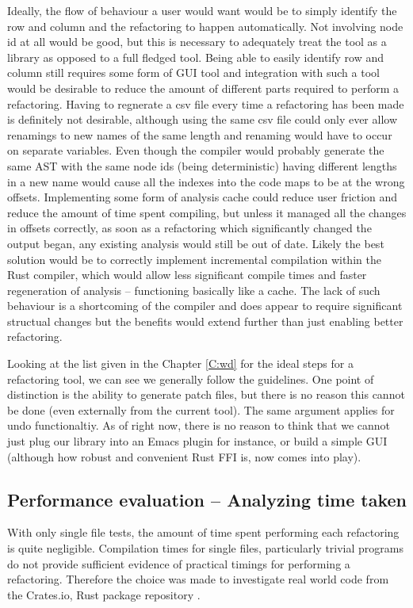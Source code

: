 Ideally, the flow of behaviour a user would want would be to simply identify the row and column and the refactoring to happen automatically. Not involving node id at all would be good, but this is necessary to adequately treat the tool as a library as opposed to a full fledged tool. Being able to easily identify row and column still requires some form of GUI tool and integration with such a tool would be desirable to reduce the amount of different parts required to perform a refactoring. Having to regnerate a csv file every time a refactoring has been made is definitely not desirable, although using the same csv file could only ever allow renamings to new names of the same length and renaming would have to occur on separate variables. Even though the compiler would probably generate the same AST with the same node ids (being deterministic) having different lengths in a new name would cause all the indexes into the code maps to be at the wrong offsets. Implementing some form of analysis cache could reduce user friction and reduce the amount of time spent compiling, but unless it managed all the changes in offsets correctly, as soon as a refactoring which significantly changed the output began, any existing analysis would still be out of date. Likely the best solution would be to correctly implement incremental compilation within the Rust compiler, which would allow less significant compile times and faster regeneration of analysis -- functioning basically like a cache. The lack of such behaviour is a shortcoming of the compiler and does appear to require significant structual changes but the benefits would extend further than just enabling better refactoring.

Looking at the list given in the Chapter \ref{C:wd} for the ideal steps for a refactoring tool, we can see we generally follow the guidelines. One point of distinction is the ability to generate patch files, but there is no reason this cannot be done (even externally from the current tool). The same argument applies for undo functionaltiy. As of right now, there is no reason to think that we cannot just plug our library into an Emacs plugin for instance, or build a simple GUI (although how robust and convenient Rust FFI is, now comes into play).


\subsection{Performance evaluation -- Analyzing time taken}\label{S:perfeval}
With only single file tests, the amount of time spent performing each refactoring is quite negligible. Compilation times for single files, particularly trivial programs do not provide sufficient evidence of practical timings for performing a refactoring. Therefore the choice was made to investigate real world code from the Crates.io, Rust package repository \cite{cratesio15}. 


